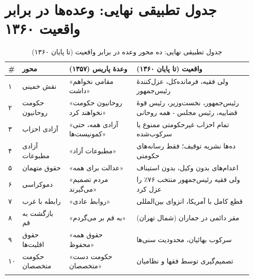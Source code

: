 \documentclass[12pt,a4paper]{book}
\begin{document}
\section{جدول تطبیقی نهایی: وعده‌ها در برابر واقعیت ۱۳۶۰}

\begin{longtable}{%
    >{\centering\arraybackslash}p{}
    >{\raggedleft\arraybackslash}p{}
    >{\raggedleft\arraybackslash}p{}
    >{\raggedleft\arraybackslash}p{}}
\toprule
\rowcolor{cAccent!10}
\textbf{\#} & \textbf{محور} & \textbf{وعدهٔ پاریس (۱۳۵۷)} & \textbf{واقعیت (تا پایان ۱۳۶۰)} \\
\midrule
\endhead

۱ &
نقش خمینی &
«مقامی نخواهم داشت» &
ولی فقیه، فرمانده‌کل، عزل‌کنندهٔ رئیس‌جمهور \\
\midrule

۲ &
حکومت روحانیون &
«روحانیون حکومت نخواهند کرد» &
رئیس‌جمهور، نخست‌وزیر، رئیس قوهٔ قضاییه، رئیس مجلس - همه روحانی \\
\midrule

۳ &
آزادی احزاب &
«آزادی همه، حتی کمونیست‌ها» &
تمام احزاب غیرحکومتی ممنوع یا سرکوب‌شده \\
\midrule

۴ &
آزادی مطبوعات &
«مطبوعات آزاد» &
ده‌ها نشریه توقیف؛ فقط رسانه‌های حکومتی \\
\midrule

۵ &
حقوق متهمان &
«عدالت برای همه» &
اعدام‌های بدون وکیل، بدون استیناف \\
\midrule

۶ &
دموکراسی &
«مردم تصمیم می‌گیرند» &
ولی فقیه رئیس‌جمهور منتخب ۷۶٪ را عزل کرد \\
\midrule

۷ &
رابطه با غرب &
«روابط عادی» &
قطع کامل با آمریکا، انزوای بین‌المللی \\
\midrule

۸ &
بازگشت به قم &
«به قم بر می‌گردم» &
مقر دائمی در جماران (شمال تهران) \\
\midrule

۹ &
حقوق اقلیت‌ها &
«حقوق همه محفوظ» &
سرکوب بهائیان، محدودیت سنی‌ها \\
\midrule

۱۰ &
حکومت متخصصان &
«حکومت دست متخصصان» &
تصمیم‌گیری توسط فقها و نظامیان \\

\bottomrule
\caption{جدول تطبیقی نهایی: ده محور وعده در برابر واقعیت (تا پایان ۱۳۶۰)}
\label{tab:final-comparison-1360}
\end{longtable}
\end{document}
